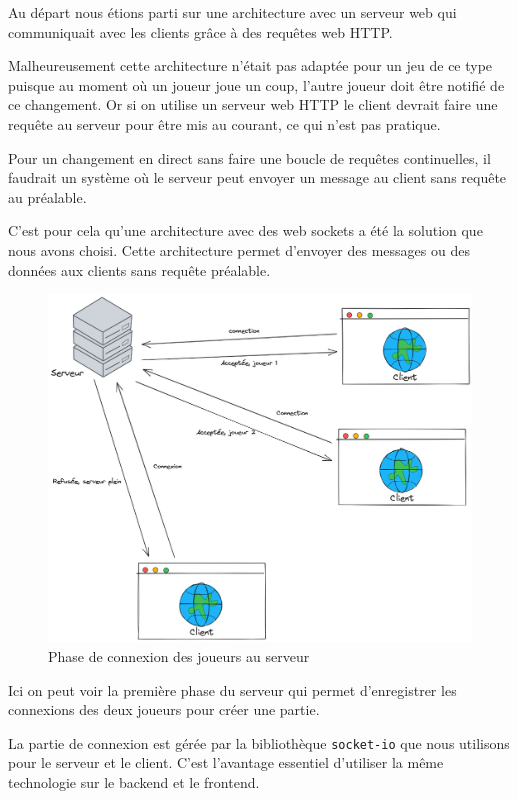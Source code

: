 Au départ nous étions parti sur une architecture avec un serveur web qui communiquait avec les clients grâce à des requêtes web HTTP.

Malheureusement cette architecture n'était pas adaptée pour un jeu de ce type puisque au moment où un joueur joue un coup, l'autre joueur doit être notifié de ce changement. Or si on utilise un serveur web HTTP le client devrait faire une requête au serveur pour être mis au courant, ce qui n'est pas pratique.

Pour un changement en direct sans faire une boucle de requêtes continuelles, il faudrait un système où le serveur peut envoyer un message au client sans requête au préalable.

C'est pour cela qu'une architecture avec des web sockets a été la solution que nous avons choisi.
Cette architecture permet d'envoyer des messages ou des données aux clients sans requête préalable.


\begin{figure}[H]
    \centering
    \includegraphics[scale=0.25]{data/reseau_initialisation.png}
    \caption{Phase de connexion des joueurs au serveur}
\end{figure}

Ici on peut voir la première phase du serveur qui permet d'enregistrer les connexions des deux joueurs pour créer une partie.

La partie de connexion est gérée par la bibliothèque {\tt socket-io} que nous utilisons pour le serveur et le client. C'est l'avantage essentiel d'utiliser la même technologie sur le backend et le frontend.

